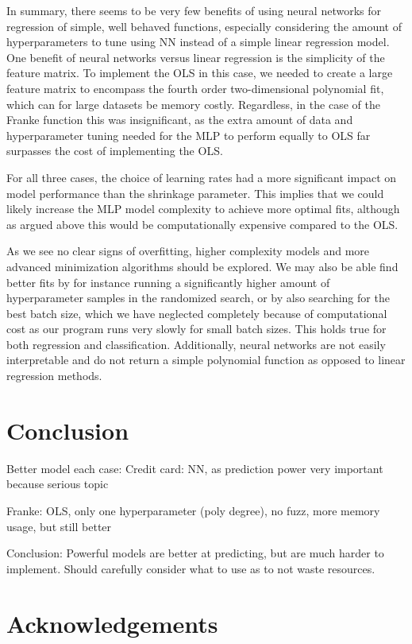 \documentclass[a4paper, 11pt, twocolumn]{article}
\begin{document}
In summary, there seems to be very few benefits of using neural networks for
regression of simple, well behaved functions, especially considering the amount
of hyperparameters to tune using NN instead of a simple linear regression model.
One benefit of neural networks versus linear regression is the simplicity of the
feature matrix. To implement the OLS in this case, we needed to create a large
feature matrix to encompass the fourth order two-dimensional polynomial fit,
which can for large datasets be memory costly. Regardless, in the case of the
Franke function this was insignificant,  as the extra amount of data and
hyperparameter tuning needed for the MLP to perform equally to OLS far surpasses
the cost of implementing the OLS.

For all three cases, the choice of learning rates had a more significant impact
on model performance than the shrinkage parameter. This implies that we could
likely increase the MLP model complexity to achieve more optimal fits, although as
argued above this would be computationally expensive compared to the OLS.


As we see no clear signs of overfitting, higher complexity models and more 
advanced minimization algorithms should be explored. We may also be able find 
better fits by for instance running a significantly higher amount of 
hyperparameter samples in the randomized search, or by also searching for the 
best batch size, which we have neglected completely because of computational 
cost as our program runs very slowly for small batch sizes. This holds true for 
both regression and classification. Additionally, neural networks are not easily 
interpretable and do not return a simple polynomial function as opposed to linear
regression methods.

\section{Conclusion}
Better model each case:
Credit card:
NN, as prediction power very important because serious topic

Franke:
OLS, only one hyperparameter (poly degree), no fuzz, more memory usage, but still better

Conclusion:
Powerful models are better at predicting, but are much harder to implement.
Should carefully consider what to use as to not waste resources.



\section*{Acknowledgements}
\end{document}
